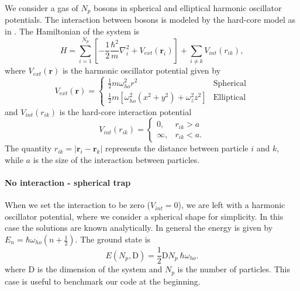 We consider a gas of $N_p$ bosons in spherical and elliptical harmonic oscillator potentials. The interaction between bosons is modeled by the hard-core model as in \cite{vmcarticle}. %
The Hamiltonian of the system is 
\begin{equation}
H = \sum_{i=1}^{N_p}\left[ -\frac{1}{2}\frac{\hbar^2}{m}\nabla_i^2 + V_{ext}(\textbf{r}_i) \right]+ \sum_{i \neq k} V_{int}(r_{ik}),
\label{eq_hamilton}
\end{equation}
where $V_{ext}(\textbf{r})$ is the harmonic oscillator potential given by
\begin{equation*}
V_{ext}(\textbf{r})=\begin{cases}
\frac{1}{2}m\omega_{ho}^2r^2 &\text{Spherical}\\
\frac{1}{2}m\left[ \omega_{ho}^2 \left(x^2 + y^2 \right) + \omega_z^2 z^2\right] &\text{Elliptical}
\end{cases}
\end{equation*}
and $V_{int}(r_{ik})$ is the hard-core interaction potential 
\begin{equation*}
V_{int}(r_{ik}) = \begin{cases}
 0, & r_{ik} > a \\
 \infty, & r_{ik} < a.
\end{cases}
\end{equation*}
The quantity $r_{ik} = |\textbf{r}_i-\textbf{r}_k|$ represents the distance between particle $i$ and $k$, while $a$ is the size of the interaction between particles. 

\paragraph{No interaction - spherical trap} When we set the interaction to be zero ($V_{int}=0$), we are left with a harmonic oscillator potential, where we consider a spherical shape for simplicity. In this case the solutions are known analytically. In general the energy is given by $E_n=\hbar\omega_{ho}(n+\frac{1}{2})$. The ground state is 
\begin{equation*}
E(N_p,\text{D}) = \frac{1}{2}\text{D} N_p\ \hbar\omega_{ho}.
\label{analitica}
\end{equation*}
where D is the dimension of the system and $N_p$ is the number of particles. This case is useful to benchmark our code at the beginning.

